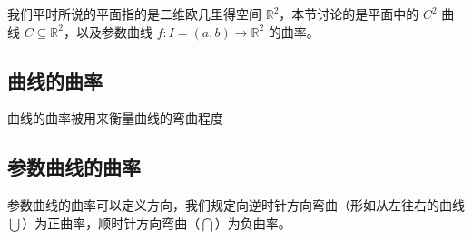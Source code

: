 
\begin{issues}
\issueDraft
\end{issues}



我们平时所说的平面指的是二维欧几里得空间 $\mathbb{R}^2$，本节讨论的是平面中的 $C^2$ 曲线 $C \subseteq \mathbb{R}^2$，以及参数曲线 $f: I = (a, b) \to \mathbb{R}^2$ 的曲率。

\subsection{曲线的曲率}

曲线的曲率被用来衡量曲线的弯曲程度

\subsection{参数曲线的曲率}

参数曲线的曲率可以定义方向，我们规定向逆时针方向弯曲（形如从左往右的曲线$\bigcup$）为正曲率，顺时针方向弯曲（$\bigcap$）为负曲率。